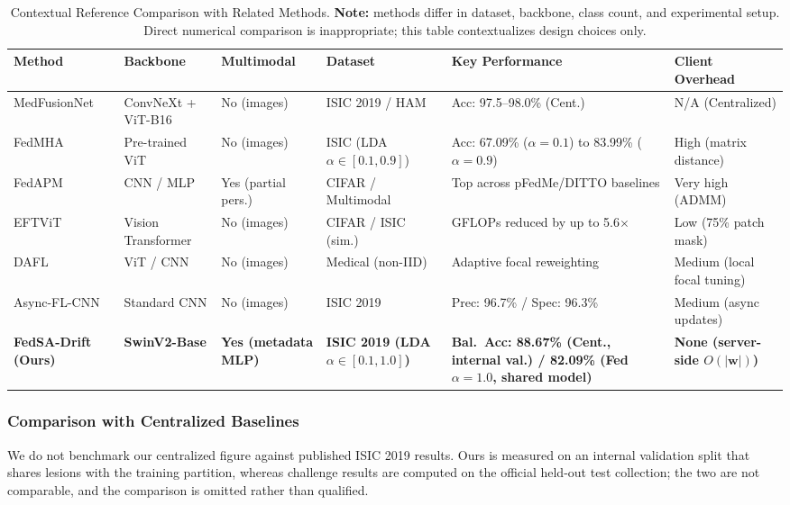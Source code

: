 \documentclass[utf8]{FrontiersinHarvard} %
\newcommand{\sadrift}{FedSA-Drift}
\begin{document}
\begin{table}[t]
\centering
\caption{Contextual Reference Comparison with Related Methods. \textbf{Note:} methods differ in dataset, backbone, class count, and experimental setup. Direct numerical comparison is inappropriate; this table contextualizes design choices only.}
\label{tab:sota_comparison}
\small
\setlength{\tabcolsep}{3pt}
\begin{tabular}{p{3.8cm}p{2.2cm}p{2.0cm}p{2.0cm}p{3.0cm}p{2.6cm}}
\toprule
Method & Backbone & Multimodal & Dataset & Key Performance & Client Overhead \\
\midrule
MedFusionNet~\citep{Naeem2025} & ConvNeXt + ViT-B16 & No (images) & ISIC 2019 / HAM & Acc: 97.5--98.0\% (Cent.) & N/A (Centralized) \\
FedMHA~\citep{Darzi2024} & Pre-trained ViT & No (images) & ISIC (LDA $\alpha \in [0.1, 0.9]$) & Acc: 67.09\% ($\alpha{=}0.1$) to 83.99\% ($\alpha{=}0.9$) & High (matrix distance) \\
FedAPM~\citep{Zhu2025} & CNN / MLP & Yes (partial pers.) & CIFAR / Multimodal & Top across pFedMe/DITTO baselines & Very high (ADMM) \\
EFTViT~\citep{Wu2024} & Vision Transformer & No (images) & CIFAR / ISIC (sim.) & GFLOPs reduced by up to 5.6$\times$ & Low (75\% patch mask) \\
DAFL~\citep{Zhao2025} & ViT / CNN & No (images) & Medical (non-IID) & Adaptive focal reweighting & Medium (local focal tuning) \\
Async-FL-CNN~\citep{Yaqoob2023} & Standard CNN & No (images) & ISIC 2019 & Prec: 96.7\% / Spec: 96.3\% & Medium (async updates) \\
\midrule
\textbf{\sadrift{} (Ours)} & \textbf{SwinV2-Base} & \textbf{Yes (metadata MLP)} & \textbf{ISIC 2019 (LDA $\alpha \in [0.1, 1.0]$)} & \textbf{Bal.\ Acc: 88.67\% (Cent., internal val.) / 82.09\% (Fed $\alpha{=}1.0$, shared model)} & \textbf{None (server-side $O(|\mathbf{w}|)$)} \\
\bottomrule
\end{tabular}
\end{table}

\subsubsection{Comparison with Centralized Baselines}

We do not benchmark our centralized figure against published ISIC 2019 results. Ours is measured on an internal validation split that shares lesions with the training partition, whereas challenge results are computed on the official held-out test collection; the two are not comparable, and the comparison is omitted rather than qualified.
\end{document}

